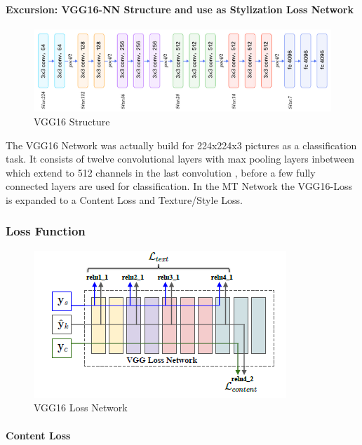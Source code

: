 \documentclass[11pt]{article}
\makeatletter
\def\maxwidth{\ifdim\Gin@nat@width>\linewidth\linewidth
    \else\Gin@nat@width\fi}
\let\Oldincludegraphics\includegraphics
\renewcommand{\includegraphics}[1]{\Oldincludegraphics[width=.8\maxwidth]{#1}}
\makeatother
\begin{document}
\paragraph{Excursion: VGG16-NN Structure and use as Stylization Loss
Network}\label{excursion-vgg16-nn-structure-and-use-as-stylization-loss-network}

\begin{figure}
\centering
\includegraphics{vgg16_struct.png}
\caption{VGG16 Structure}
\end{figure}

The VGG16 Network was actually build for 224x224x3 pictures as a
classification task. It consists of twelve convolutional layers with max
pooling layers inbetween which extend to 512 channels in the last
convolution , before a few fully connected layers are used for
classification. In the MT Network the VGG16-Loss is expanded to a
Content Loss and Texture/Style Loss.

\subsubsection{Loss Function}\label{loss-function}

\begin{figure}
\centering
\includegraphics{loss_net.png}
\caption{VGG16 Loss Network}
\end{figure}

\paragraph{Content Loss}\label{content-loss}
\end{document}
